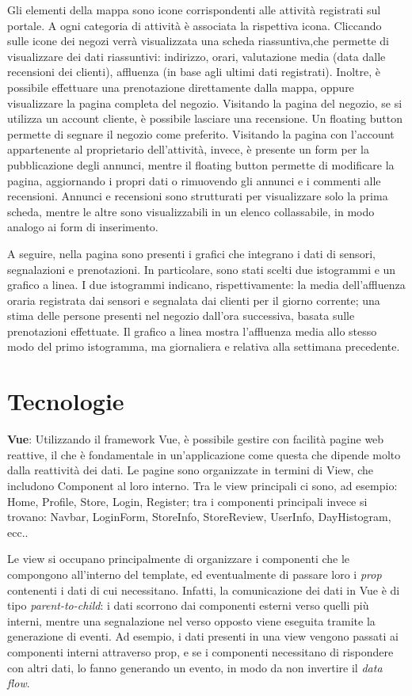 \documentclass[a4paper]{report}
\begin{document}
Gli elementi della mappa sono icone corrispondenti alle attività registrati sul portale.
%
A ogni categoria di attività è associata la rispettiva icona.
%
Cliccando sulle icone dei negozi verrà visualizzata una scheda riassuntiva,che permette di visualizzare dei dati riassuntivi: indirizzo, orari, valutazione media (data dalle recensioni dei clienti), affluenza (in base agli ultimi dati registrati). Inoltre, è possibile effettuare una prenotazione direttamente dalla mappa, oppure visualizzare la pagina completa del negozio.
%
Visitando la pagina del negozio, se si utilizza un account cliente, è possibile lasciare una recensione. Un floating button permette di segnare il negozio come preferito.
%
Visitando la pagina con l’account appartenente al proprietario dell’attività, invece, è presente un form per la pubblicazione degli annunci, mentre il floating button permette di modificare la pagina, aggiornando i propri dati o rimuovendo gli annunci e i commenti alle recensioni. Annunci e recensioni sono strutturati per visualizzare solo la prima scheda, mentre le altre sono visualizzabili in un elenco collassabile, in modo analogo ai form di inserimento.
%

A seguire, nella pagina sono presenti i grafici che integrano i dati di sensori, segnalazioni e prenotazioni. In particolare, sono stati scelti due istogrammi e un grafico a linea. I due istogrammi indicano, rispettivamente: la media dell’affluenza oraria registrata dai sensori e segnalata dai clienti per il giorno corrente; una stima delle persone presenti nel negozio dall’ora successiva, basata sulle prenotazioni effettuate. Il grafico a linea mostra l’affluenza media allo stesso modo del primo istogramma, ma giornaliera e relativa alla settimana precedente.

\chapter{Tecnologie}

\textbf{Vue}: Utilizzando il framework Vue, è possibile gestire con facilità pagine web reattive, il che è fondamentale in un’applicazione come questa che dipende molto dalla reattività dei dati. Le pagine sono organizzate in termini di View, che includono Component al loro interno. Tra le view principali ci sono, ad esempio: Home, Profile, Store, Login, Register; tra i componenti principali invece si trovano: Navbar, LoginForm, StoreInfo, StoreReview, UserInfo, DayHistogram, ecc..

Le view si occupano principalmente di organizzare i componenti che le compongono all’interno del template, ed eventualmente di passare loro i \textit{prop} contenenti i dati di cui necessitano.
Infatti, la comunicazione dei dati in Vue è di tipo \textit{parent-to-child}: i dati scorrono dai componenti esterni verso quelli più interni, mentre una segnalazione nel verso opposto viene eseguita tramite la generazione di eventi. Ad esempio, i dati presenti in una view vengono passati ai componenti interni attraverso prop, e se i componenti necessitano di rispondere con altri dati, lo fanno generando un evento, in modo da non invertire il \textit{data flow}.
\end{document}
